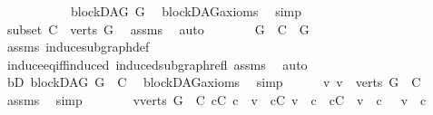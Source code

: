 \begin{isabellebody}
\ \ \isamarkupfalse%
\ \ \isanewline
\ \ \ \ \isamarkupfalse%
\ {\isachardoublequoteopen}blockDAG\ G{\isachardoublequoteclose}\ \isamarkupfalse%
\ blockDAG{\isacharunderscore}{\kern0pt}axioms\ \isamarkupfalse%
\ simp\isanewline
\ \ \isamarkupfalse%
\ \isanewline
\ \ \ \ \isamarkupfalse%
\ subset{\isacharcolon}{\kern0pt}\ {\isachardoublequoteopen}C\ {\isasymsubseteq}\ verts\ G{\isachardoublequoteclose}\ \isamarkupfalse%
\ assms\ \isamarkupfalse%
\ auto\isanewline
\ \ \ \ \isamarkupfalse%
\ \isamarkupfalse%
\ {\isachardoublequoteopen}G\ {\isasymrestriction}\ C\ {\isacharequal}{\kern0pt}\ G{\isachardoublequoteclose}\ \isamarkupfalse%
\ assms\ induce{\isacharunderscore}{\kern0pt}subgraph{\isacharunderscore}{\kern0pt}def\isanewline
\ \ \ \ \ \ \isamarkupfalse%
\ induce{\isacharunderscore}{\kern0pt}eq{\isacharunderscore}{\kern0pt}iff{\isacharunderscore}{\kern0pt}induced\ induced{\isacharunderscore}{\kern0pt}subgraph{\isacharunderscore}{\kern0pt}refl\ assms\ \isamarkupfalse%
\ auto\ \isanewline
\ \ \ \ \isamarkupfalse%
\ \isamarkupfalse%
\ bD{\isacharcolon}{\kern0pt}\ {\isachardoublequoteopen}blockDAG\ {\isacharparenleft}{\kern0pt}G\ {\isasymrestriction}\ C{\isacharparenright}{\kern0pt}{\isachardoublequoteclose}\ \isamarkupfalse%
\ blockDAG{\isacharunderscore}{\kern0pt}axioms\ \isamarkupfalse%
\ simp\isanewline
\ \ \ \ \isamarkupfalse%
\ {\isachardoublequoteopen}{\isasymnexists}v{\isachardot}{\kern0pt}\ v\ {\isasymin}\ {\isacharparenleft}{\kern0pt}verts\ G{\isacharparenright}{\kern0pt}\ {\isacharminus}{\kern0pt}\ C{\isachardoublequoteclose}\ \isamarkupfalse%
\ assms\ \isamarkupfalse%
\ simp\isanewline
\ \ \ \ \isamarkupfalse%
\ \isamarkupfalse%
\ {\isachardoublequoteopen}{\isacharparenleft}{\kern0pt}{\isasymforall}v{\isasymin}verts\ G\ {\isacharminus}{\kern0pt}\ C{\isachardot}{\kern0pt}\ {\isacharparenleft}{\kern0pt}{\isasymforall}c{\isasymin}C{\isachardot}{\kern0pt}\ c\ {\isasymrightarrow}\isactrlsup {\isacharplus}{\kern0pt}\ v{\isacharparenright}{\kern0pt}\ {\isasymor}\ {\isacharparenleft}{\kern0pt}{\isasymforall}c{\isasymin}C{\isachardot}{\kern0pt}\ v\ {\isasymrightarrow}\isactrlsup {\isacharplus}{\kern0pt}\ c{\isacharparenright}{\kern0pt}\ {\isasymor}\ {\isacharparenleft}{\kern0pt}{\isasymforall}c{\isasymin}C{\isachardot}{\kern0pt}\ {\isasymnot}\ v\ {\isasymrightarrow}\isactrlsup {\isacharplus}{\kern0pt}\ c\ {\isasymand}\ {\isasymnot}\ v\ {\isasymrightarrow}\isactrlsup {\isacharplus}{\kern0pt}\ c{\isacharparenright}{\kern0pt}{\isacharparenright}{\kern0pt}{\isachardoublequoteclose}\isanewline

\end{isabellebody}

